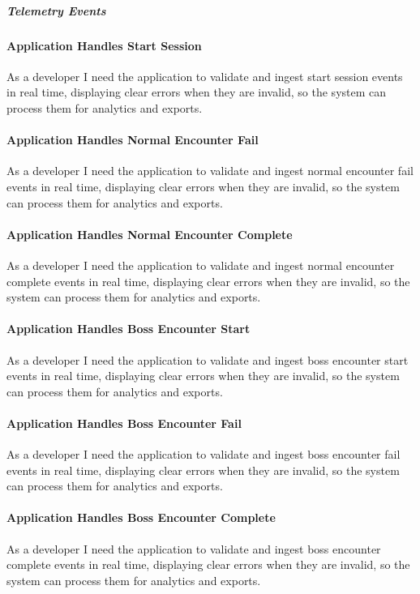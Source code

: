 \subparagraph{Telemetry Events}

\paragraph{Application Handles Start Session}
As a developer I need the application to validate and ingest start session events in real time, displaying clear errors when they are invalid, so the system can process them for analytics and exports.

\paragraph{Application Handles Normal Encounter Fail}
As a developer I need the application to validate and ingest normal encounter fail events in real time, displaying clear errors when they are invalid, so the system can process them for analytics and exports.

\paragraph{Application Handles Normal Encounter Complete}
As a developer I need the application to validate and ingest normal encounter complete events in real time, displaying clear errors when they are invalid, so the system can process them for analytics and exports.

\paragraph{Application Handles Boss Encounter Start}
As a developer I need the application to validate and ingest boss encounter start events in real time, displaying clear errors when they are invalid, so the system can process them for analytics and exports.

\paragraph{Application Handles Boss Encounter Fail}
As a developer I need the application to validate and ingest boss encounter fail events in real time, displaying clear errors when they are invalid, so the system can process them for analytics and exports.

\paragraph{Application Handles Boss Encounter Complete}
As a developer I need the application to validate and ingest boss encounter complete events in real time, displaying clear errors when they are invalid, so the system can process them for analytics and exports.

